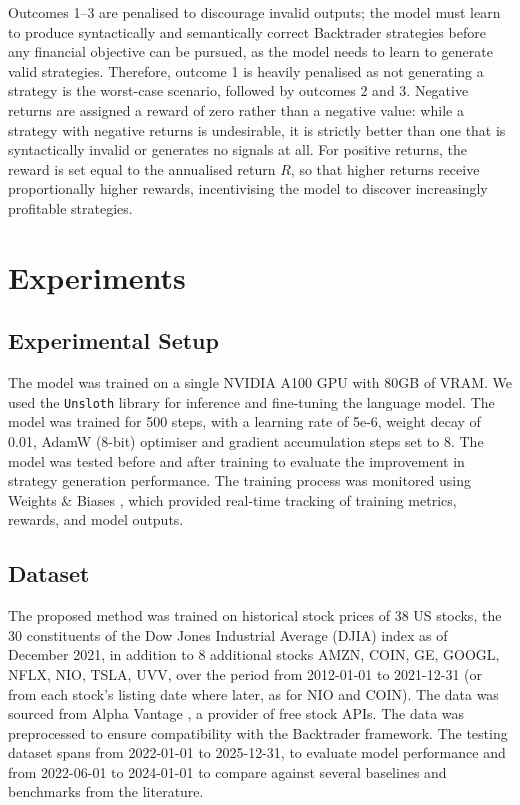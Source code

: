 \documentclass[12pt, a4paper]{report}
\begin{document}
Outcomes 1--3 are penalised to discourage invalid outputs; 
the model must learn to produce syntactically and semantically correct Backtrader strategies before any financial objective can be pursued, as the model needs to learn to generate valid strategies. 
Therefore, outcome 1 is heavily penalised as not generating a strategy is the worst-case scenario, followed by outcomes 2 and 3. 
Negative returns are assigned a reward of zero rather than a negative value: while a strategy with negative returns is undesirable, it
is strictly better than one that is syntactically invalid or generates no signals at
all. For positive returns, the reward is set equal to the annualised return $R$, so that
higher returns receive proportionally higher rewards, incentivising the model to
discover increasingly profitable strategies.

\chapter{Experiments}
\label{ch:experiments}

\section{Experimental Setup}
The model was trained on a single NVIDIA A100 GPU with 80GB of VRAM. We used the \texttt{Unsloth} library \cite{unsloth2024} for inference and
fine-tuning the language model. The model was trained for 500 steps, with a learning rate of 5e-6, weight decay of 0.01, 
AdamW (8-bit) optimiser and gradient accumulation steps set to 8. The model was tested before and after training to evaluate the improvement in strategy generation performance.
The training process was monitored using Weights \& Biases \cite{wandb2024}, which provided real-time tracking of training metrics, rewards, and model outputs. 

\section{Dataset}
The proposed method was trained on historical stock prices of 38 US stocks,
the 30 constituents of the Dow Jones Industrial Average (DJIA) index as of December 2021,
in addition to 8 additional stocks AMZN, COIN, GE, GOOGL, NFLX, NIO, TSLA, UVV, over the period from 2012-01-01 to 2021-12-31 (or from each stock's listing date where later, as for NIO and COIN).
The data was sourced from Alpha Vantage \cite{alphavantage2024}, a provider of free stock APIs.
The data was preprocessed to ensure compatibility with the Backtrader framework. 
The testing dataset spans from 2022-01-01 to 2025-12-31, to evaluate model performance and from 2022-06-01 to 2024-01-01 to compare against several baselines and benchmarks from the literature.
\end{document}
